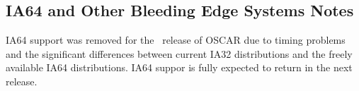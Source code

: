 \subsection{IA64 and Other Bleeding Edge Systems Notes}
\label{subsec:ia64notes}

IA64 support was removed for the \oscarversion\ release of OSCAR due to
timing problems and the significant differences between current IA32
distributions and the freely available IA64 distributions.  IA64 suppor is
fully expected to return in the next release.

%
% 
%   
% 
% 
% 
% 

